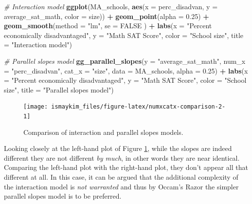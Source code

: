 \documentclass[12pt, krantz2,]{krantz}
\makeatletter
\newenvironment{Shaded}{\begin{snugshade}}{\end{snugshade}}
\newcommand{\CommentTok}[1]{\textcolor[rgb]{0.37,0.37,0.37}{\textit{#1}}}
\newcommand{\DataTypeTok}[1]{\textcolor[rgb]{0.27,0.27,0.27}{#1}}
\newcommand{\FloatTok}[1]{\textcolor[rgb]{0.06,0.06,0.06}{#1}}
\newcommand{\KeywordTok}[1]{\textcolor[rgb]{0.27,0.27,0.27}{\textbf{#1}}}
\newcommand{\NormalTok}[1]{#1}
\newcommand{\OperatorTok}[1]{\textcolor[rgb]{0.43,0.43,0.43}{\textbf{#1}}}
\newcommand{\OtherTok}[1]{\textcolor[rgb]{0.37,0.37,0.37}{#1}}
\newcommand{\StringTok}[1]{\textcolor[rgb]{0.5,0.5,0.5}{#1}}
\newenvironment{kframe}{%
\medskip{}
\setlength{\fboxsep}{.8em}
 \def\at@end@of@kframe{}%
 \ifinner\ifhmode%
  \def\at@end@of@kframe{\end{minipage}}%
  \begin{minipage}{\columnwidth}%
 \fi\fi%
 \def\FrameCommand##1{\hskip\@totalleftmargin \hskip-\fboxsep
 \colorbox{shadecolor}{##1}\hskip-\fboxsep
     \hskip-\linewidth \hskip-\@totalleftmargin \hskip\columnwidth}%
 \MakeFramed {\advance\hsize-\width
   \@totalleftmargin\z@ \linewidth\hsize
   \@setminipage}}%
 {\par\unskip\endMakeFramed%
 \at@end@of@kframe}
\renewenvironment{Shaded}{\begin{kframe}}{\end{kframe}}
\makeatother
\begin{document}
\begin{Shaded}
\begin{Highlighting}[]
\CommentTok{# Interaction model}
\KeywordTok{ggplot}\NormalTok{(MA_schools, }\KeywordTok{aes}\NormalTok{(}\DataTypeTok{x =}\NormalTok{ perc_disadvan, }\DataTypeTok{y =}\NormalTok{ average_sat_math, }\DataTypeTok{color =}\NormalTok{ size)) }\OperatorTok{+}
\StringTok{  }\KeywordTok{geom_point}\NormalTok{(}\DataTypeTok{alpha =} \FloatTok{0.25}\NormalTok{) }\OperatorTok{+}
\StringTok{  }\KeywordTok{geom_smooth}\NormalTok{(}\DataTypeTok{method =} \StringTok{"lm"}\NormalTok{, }\DataTypeTok{se =} \OtherTok{FALSE}\NormalTok{ ) }\OperatorTok{+}
\StringTok{  }\KeywordTok{labs}\NormalTok{(}\DataTypeTok{x =} \StringTok{"Percent economically disadvantaged"}\NormalTok{, }\DataTypeTok{y =} \StringTok{"Math SAT Score"}\NormalTok{, }
       \DataTypeTok{color =} \StringTok{"School size"}\NormalTok{, }\DataTypeTok{title =} \StringTok{"Interaction model"}\NormalTok{)}

\CommentTok{# Parallel slopes model}
\KeywordTok{gg_parallel_slopes}\NormalTok{(}\DataTypeTok{y =} \StringTok{"average_sat_math"}\NormalTok{, }\DataTypeTok{num_x =} \StringTok{"perc_disadvan"}\NormalTok{, }
                   \DataTypeTok{cat_x =} \StringTok{"size"}\NormalTok{, }\DataTypeTok{data =}\NormalTok{ MA_schools, }\DataTypeTok{alpha =} \FloatTok{0.25}\NormalTok{) }\OperatorTok{+}\StringTok{ }
\StringTok{  }\KeywordTok{labs}\NormalTok{(}\DataTypeTok{x =} \StringTok{"Percent economically disadvantaged"}\NormalTok{, }\DataTypeTok{y =} \StringTok{"Math SAT Score"}\NormalTok{, }
       \DataTypeTok{color =} \StringTok{"School size"}\NormalTok{, }\DataTypeTok{title =} \StringTok{"Parallel slopes model"}\NormalTok{) }
\end{Highlighting}
\end{Shaded}

\begin{figure}

{\centering \texttt{[image: ismaykim\_files/figure-latex/numxcatx-comparison-2-1]} 

}

\caption{Comparison of interaction and parallel slopes models.}\label{fig:numxcatx-comparison-2}
\end{figure}

Looking closely at the left-hand plot of Figure \ref{fig:numxcatx-comparison-2}, while the slopes are indeed different they are not different \emph{by much}, in other words they are near identical. Comparing the left-hand plot with the right-hand plot, they don't appear all that different at all. In this case, it can be argued that the additional complexity of the interaction model is \emph{not warranted} and thus by Occam's Razor the simpler parallel slopes model is to be preferred.
\end{document}
